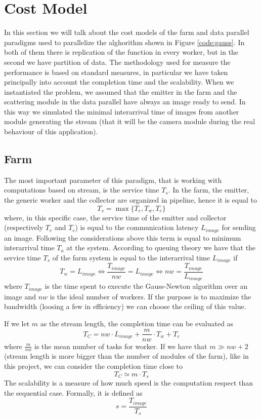 \section{Cost Model}

In this section we will talk about the cost models of the farm and data parallel paradigms used to parallelize the alghorithm shown in Figure \ref{code:gauss}. In both of them there is replication of the function in every worker, but in the second we have partition of data. The methodology used for measure the performance is based on standard measures, in particular we have taken principally into account the completion time and the scalability. When we instantiated the problem, we assumed that the emitter in the farm and the scattering module in the data parallel have always an image ready to send. In this way we simulated the minimal interarrival time of images from another module generating the stream (that it will be the camera module during the real behaviour of this application).

\subsection{Farm}

The most important parameter of this paradigm, that is working with computations based on stream, is the service time $T_{s}$. In the farm, the emitter, the generic worker and the collector are organized in pipeline, hence it is equal to
\[
T_{s} = \max \lbrace T_{e}, T_{w}, T_{c}\rbrace
\]
where, in this specific case, the service time of the emitter and collector (respectively $T_{e}$ and $T_{c}$) is equal to the communication latency $L_{image}$ for sending an image. Following the considerations above this term is equal to minimum interarrival time $T_{a}$ at the system. According to queuing theory we have that the service time $T_{s}$ of the farm system is equal to the interarrival time $L_{image}$ if
\[
T_{w} = L_{image} \Leftrightarrow \frac{T_{image}}{nw} = L_{image} \Leftrightarrow nw = \frac{T_{image}}{L_{image}} 
\]
where $T_{image}$ is the time spent to execute the Gauss-Newton algorithm over an image and $nw$ is the ideal number of workers. If the purpose is to maximize the bandwidth (loosing a few in efficiency) we can choose the ceiling of this value.

If we let $m$ as the stream length, the completion time can be evaluated as
\[
T_{C} = nw \cdot L_{image} + \frac{m}{nw} \cdot T_{w} + T_{c} 
\]
where $\frac{m}{nw}$ is the mean number of tasks for worker.
If we have that $m \gg nw+2$ (stream length is more bigger than the number of modules of the farm), like in this project, we can consider the completion time close to
\[
T_{C} \simeq m \cdot T_{s}
\]
The scalability is a measure of how much speed is the computation respect than the sequential case. Formally, it is defined as
\[
s = \frac{T_{image}}{T_{s}}
\]
